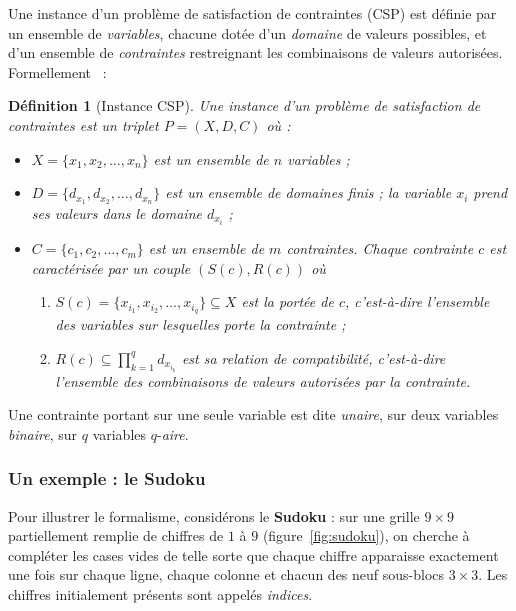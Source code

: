 \documentclass[11pt,a4paper]{article}
\newtheorem{definition}{Définition}
\begin{document}
Une instance d'un problème de satisfaction de contraintes (CSP) est
définie par un ensemble de \emph{variables}, chacune dotée d'un
\emph{domaine} de valeurs possibles, et d'un ensemble de
\emph{contraintes} restreignant les combinaisons de valeurs autorisées.
Formellement~\cite{varet2022} :

\begin{definition}[Instance CSP]
Une instance d'un problème de satisfaction de contraintes est un triplet
$P = (X, D, C)$ où :
\begin{itemize}
  \item $X = \{x_1, x_2, \dots, x_n\}$ est un ensemble de $n$
    \emph{variables} ;
  \item $D = \{d_{x_1}, d_{x_2}, \dots, d_{x_n}\}$ est un ensemble de
    \emph{domaines finis} ; la variable $x_i$ prend ses valeurs dans
    le domaine $d_{x_i}$ ;
  \item $C = \{c_1, c_2, \dots, c_m\}$ est un ensemble de $m$
    \emph{contraintes}. Chaque contrainte $c$ est caractérisée par un
    couple $(S(c), R(c))$ où
    \begin{enumerate}
      \item $S(c) = \{x_{i_1}, x_{i_2}, \dots, x_{i_q}\} \subseteq X$
        est la \emph{portée} de $c$, c'est-à-dire l'ensemble des
        variables sur lesquelles porte la contrainte ;
      \item $R(c) \subseteq \displaystyle\prod_{k=1}^{q} d_{x_{i_k}}$
        est sa \emph{relation de compatibilité}, c'est-à-dire l'ensemble
        des combinaisons de valeurs autorisées par la contrainte.
    \end{enumerate}
\end{itemize}
\end{definition}

Une contrainte portant sur une seule variable est dite \emph{unaire},
sur deux variables \emph{binaire}, sur $q$ variables $q$-\emph{aire}.

\subsubsection{Un exemple : le Sudoku}
\label{sec:ppc-exemple}

Pour illustrer le formalisme, considérons le \textbf{Sudoku} : sur une
grille $9 \times 9$ partiellement remplie de chiffres de $1$ à $9$
(figure~\ref{fig:sudoku}), on cherche à compléter les cases vides de
telle sorte que chaque chiffre apparaisse exactement une fois sur
chaque ligne, chaque colonne et chacun des neuf sous-blocs
$3 \times 3$. Les chiffres initialement présents sont appelés
\emph{indices}.
\end{document}
